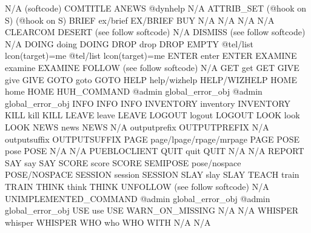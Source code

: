 \documentclass[letterpaper,10pt,english]{sphinxmanual}
\begin{document}
\begin{description}
N/A                     (softcode)                     COMTITLE
ANEWS                   @dynhelp                       N/A
ATTRIB\_SET              (@hook on S)                   (@hook on S)
BRIEF                   ex/brief                       EX/BRIEF
BUY                     N/A                            N/A
N/A                     N/A                            CLEARCOM
DESERT                  (see follow softcode)          N/A
DISMISS                 (see follow softcode)          N/A
DOING                   doing                          DOING
DROP                    drop                           DROP
EMPTY                   @tel/list lcon(target)=me      @tel/list lcon(target)=me
ENTER                   enter                          ENTER
EXAMINE                 examine                        EXAMINE
FOLLOW                  (see follow softcode)          N/A
GET                     get                            GET
GIVE                    give                           GIVE
GOTO                    goto                           GOTO
HELP                    help/wizhelp                   HELP/WIZHELP
HOME                    home                           HOME
HUH\_COMMAND             @admin global\_error\_obj        @admin global\_error\_obj
INFO                    INFO                           INFO
INVENTORY               inventory                      INVENTORY
KILL                    kill                           KILL
LEAVE                   leave                          LEAVE
LOGOUT                  logout                         LOGOUT
LOOK                    look                           LOOK
NEWS                    news                           NEWS
N/A                     outputprefix                   OUTPUTPREFIX
N/A                     outputsuffix                   OUTPUTSUFFIX
PAGE                    page/lpage/rpage/mrpage        PAGE
POSE                    pose                           POSE
N/A                     N/A                            PUEBLOCLIENT
QUIT                    quit                           QUIT
N/A                     N/A                            REPORT
SAY                     say                            SAY
SCORE                   score                          SCORE
SEMIPOSE                pose/nospace                   POSE/NOSPACE
SESSION                 session                        SESSION
SLAY                    slay                           SLAY
TEACH                   train                          TRAIN
THINK                   think                          THINK
UNFOLLOW                (see follow softcode)          N/A
UNIMPLEMENTED\_COMMAND   @admin global\_error\_obj        @admin global\_error\_obj
USE                     use                            USE
WARN\_ON\_MISSING         N/A                            N/A
WHISPER                 whisper                        WHISPER
WHO                     who                            WHO
WITH                    N/A                            N/A

\end{description}
\end{document}
